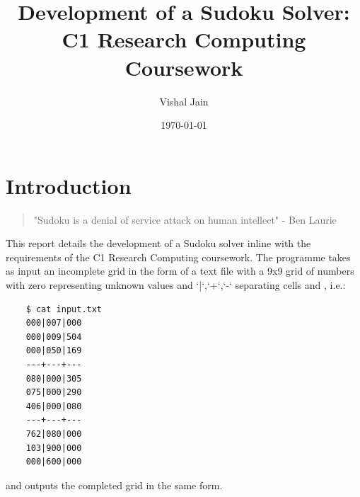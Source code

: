 \documentclass[11pt]{article}
\title{Development of a Sudoku Solver: C1 Research Computing Coursework}
\author{Vishal Jain}
\date{\today}
\begin{document}
\maketitle

\tableofcontents

\newpage

\section{Introduction}

\begin{quote}
    "Sudoku is a denial of service attack on human
  intellect" - Ben Laurie
\end{quote}

This report details the development of a Sudoku solver inline with the requirements of the C1 Research Computing coursework. The programme takes as input an incomplete grid in the form of a text file with a 9x9 grid of numbers with zero representing unknown values and `|`,`+`,`-` separating cells and , i.e.:


\begin{verbatim}
    $ cat input.txt
    000|007|000
    000|009|504
    000|050|169
    ---+---+---
    080|000|305
    075|000|290
    406|000|080
    ---+---+---
    762|080|000
    103|900|000
    000|600|000
    \end{verbatim}

and outputs the completed grid in the same form.
\end{document}
